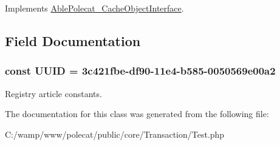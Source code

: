 Implements \hyperlink{interface_able_polecat___cache_object_interface_a3f2135f6ad45f51d075657f6d20db2cd}{Able\+Polecat\+\_\+\+Cache\+Object\+Interface}.



\subsection{Field Documentation}
\hypertarget{class_able_polecat___transaction___test_a74b892c8c0b86bf9d04c5819898c51e7}{}
\subsubsection[{U\+U\+I\+D}]{\setlength{\rightskip}{0pt plus 5cm}const U\+U\+I\+D = \textquotesingle{}3c421fbe-\/df90-\/11e4-\/b585-\/0050569e00a2\textquotesingle{}}\label{class_able_polecat___transaction___test_a74b892c8c0b86bf9d04c5819898c51e7}
Registry article constants. 

The documentation for this class was generated from the following file\+:\begin{DoxyCompactItemize}
\item 
C\+:/wamp/www/polecat/public/core/\+Transaction/Test.\+php\end{DoxyCompactItemize}
